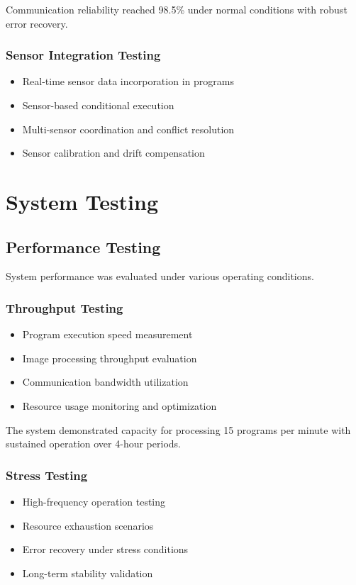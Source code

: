 Communication reliability reached 98.5\% under normal conditions with robust error recovery.

\subsubsection{Sensor Integration Testing}
\begin{itemize}
    \item Real-time sensor data incorporation in programs
    \item Sensor-based conditional execution
    \item Multi-sensor coordination and conflict resolution
    \item Sensor calibration and drift compensation
\end{itemize}

\section{System Testing}

\subsection{Performance Testing}

System performance was evaluated under various operating conditions.

\subsubsection{Throughput Testing}
\begin{itemize}
    \item Program execution speed measurement
    \item Image processing throughput evaluation
    \item Communication bandwidth utilization
    \item Resource usage monitoring and optimization
\end{itemize}

The system demonstrated capacity for processing 15 programs per minute with sustained operation over 4-hour periods.

\subsubsection{Stress Testing}
\begin{itemize}
    \item High-frequency operation testing
    \item Resource exhaustion scenarios
    \item Error recovery under stress conditions
    \item Long-term stability validation
\end{itemize}

